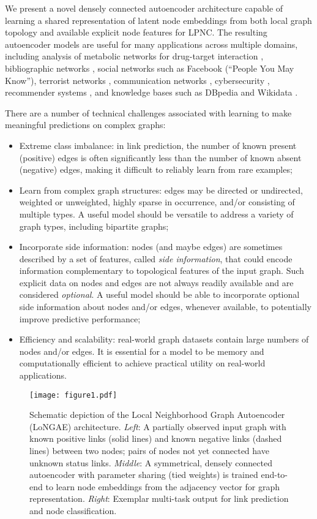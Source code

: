 \documentclass[letterpaper, conference]{IEEEtran}
\begin{document}
We present a novel densely connected autoencoder architecture capable of learning a shared representation of latent node embeddings from both local graph topology and available explicit node features for LPNC. The resulting autoencoder models are useful for many applications across multiple domains, including analysis of metabolic networks for drug-target interaction \cite{fakhraei:2014}, bibliographic networks \cite{Sen:2008}, social networks such as Facebook (``People You May Know''), terrorist networks \cite{Zhao:2006}, communication networks \cite{Huang:2009}, cybersecurity \cite{fakhraei:2015}, recommender systems \cite{Koren:2009}, and knowledge bases such as DBpedia and Wikidata \cite{Yang:2015}.

There are a number of technical challenges associated with learning to make meaningful predictions on complex graphs:

\begin{itemize}
\item Extreme class imbalance: in link prediction, the number of known present (positive) edges is often significantly less than the number of known absent (negative) edges, making it difficult to reliably learn from rare examples;
\item Learn from complex graph structures: edges may be directed or undirected, weighted or unweighted, highly sparse in occurrence, and/or consisting of multiple types. A useful model should be versatile to address a variety of graph types, including bipartite graphs;
\item Incorporate side information: nodes (and maybe edges) are sometimes described by a set of features, called \emph{side information}, that could encode information complementary to topological features of the input graph. Such explicit data on nodes and edges are not always readily available and are considered \emph{optional}. A useful model should be able to incorporate optional side information about nodes and/or edges, whenever available, to potentially improve predictive performance;
\item Efficiency and scalability: real-world graph datasets contain large numbers of nodes and/or edges. It is essential for a model to be memory and computationally efficient to achieve practical utility on real-world applications.
\end{itemize}

\begin{figure*}
\centering
\texttt{[image: figure1.pdf]}
\centering
\caption{Schematic depiction of the Local Neighborhood Graph Autoencoder (LoNGAE) architecture. \emph{Left}: A partially observed input graph with known positive links (solid lines) and known negative links (dashed lines) between two nodes; pairs of nodes not yet connected have unknown status links. \emph{Middle}: A symmetrical, densely connected autoencoder with parameter sharing (tied weights) is trained end-to-end to learn node embeddings from the adjacency vector for graph representation. \emph{Right}: Exemplar multi-task output for link prediction and node classification.}
\label{fig1}
\end{figure*}
\end{document}
